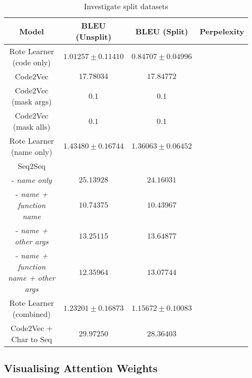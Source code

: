 
\begin{table}[!ht]
\begin{center}
\begin{tabular}{ c | c | c | c }
    Model                             & BLEU (Unsplit)  & BLEU (Split)    & Perpelexity \\
    \hline
    Rote Learner  (code only)         & $ 1.01257 \pm  0.11410 $ & $ 0.84707 \pm 0.04996 $ & \\
    Code2Vec                          & $ 17.78034 $ & $ 17.84772 $ & \\
    Code2Vec  (mask args)             & $ 0.1 $ & $ 0.1$ & \\
    Code2Vec  (mask alls)             & $ 0.1 $ & $ 0.1 $ & \\
    \hline
    \hline
    Rote Learner  (name only)         & $ 1.43480 \pm  0.16744 $ & $ 1.36063 \pm 0.06452 $ & \\
    \hline
    Seq2Seq                             & &  & \\
     - \textit{name only}               & $ 25.13928 $ & $ 24.16031 $ & \\
    - \textit{name + function name}     & $ 10.74375 $ & $ 10.43967 $ & \\
    - \textit{name + other args}        & $ 13.25115 $ & $ 13.64877 $ & \\
    - \textit{name + function name + other args}    & $ 12.35964 $ & $ 13.07744 $ &  \\
    \hline
    \hline
    Rote Learner (combined)            & $ 1.23201 \pm  0.16873 $ & $ 1.15672 \pm 0.10083 $ & \\
    Code2Vec  + Char to Seq            & $ 29.97250 $ & $ 28.36403 $ & \\
    \hline
\end{tabular}
\caption {Investigate split datasets}
\label{table:split_datasets_embed}
\end{center}
\end{table}


\subsection{Visualising Attention Weights} %
\label{sub:visualising_attention_weights}


